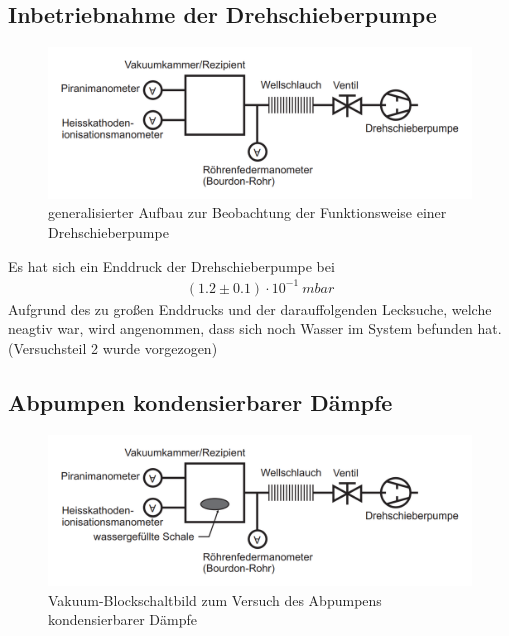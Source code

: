 \documentclass[12pt, a4paper]{scrartcl}
\begin{document}
	\subsection{Inbetriebnahme der Drehschieberpumpe}
	
        \begin{figure}[H]
            \centering
            \includegraphics[width=.5\paperwidth]{aufbau21}
            \caption{generalisierter Aufbau zur Beobachtung der Funktionsweise einer Drehschieberpumpe}
            \label{fig:anord1}
        \end{figure}
    
    	
    	
    	Es hat sich ein Enddruck der Drehschieberpumpe bei \begin{align*}
            (1.2\pm 0.1)\cdot 10^{-1}\ mbar
        \end{align*}
        Aufgrund des zu großen Enddrucks und der darauffolgenden Lecksuche, welche neagtiv war, wird angenommen, dass sich noch Wasser im System befunden hat. (Versuchsteil 2 wurde vorgezogen)
    
    
    
    \subsection{Abpumpen kondensierbarer Dämpfe}
    
		\begin{figure}[H]
			\centering
			\includegraphics[width=.5\paperwidth]{aufbau22}
			\caption{Vakuum-Blockschaltbild zum Versuch des Abpumpens kondensierbarer Dämpfe}
            \label{fig:anord2}
		\end{figure}
	
\end{document}
